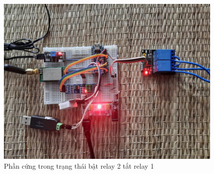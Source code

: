 \begin{figure}[H]
	\centering
	\includegraphics[scale=0.2]{Chapter 4/image chapter 4/R2ONR1OFF.jpg}
	\caption[Phần cứng trong trạng thái bật relay 2 tắt relay 1]{Phần cứng trong trạng thái bật relay 2 tắt relay 1}
	\label{hinh48}
\end{figure}
